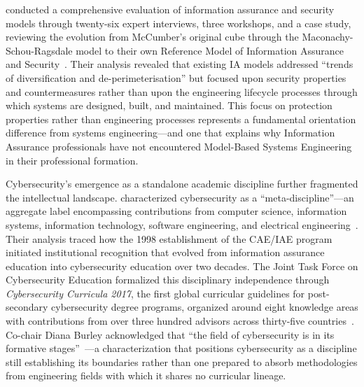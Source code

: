 \citeauthor{Cherdantseva_2016} conducted a comprehensive evaluation of information assurance and security models through twenty-six expert interviews, three workshops, and a case study, reviewing the evolution from McCumber's original cube through the Maconachy-Schou-Ragsdale model to their own Reference Model of Information Assurance and Security~\parencite{Cherdantseva_2016}. Their analysis revealed that existing IA models addressed ``trends of diversification and de-perimeterisation'' but focused upon security properties and countermeasures rather than upon the engineering lifecycle processes through which systems are designed, built, and maintained. This focus on protection properties rather than engineering processes represents a fundamental orientation difference from systems engineering---and one that explains why Information Assurance professionals have not encountered Model-Based Systems Engineering in their professional formation.

Cybersecurity's emergence as a standalone academic discipline further fragmented the intellectual landscape. \citeauthor{Parrish_2018} characterized cybersecurity as a ``meta-discipline''---an aggregate label encompassing contributions from computer science, information systems, information technology, software engineering, and electrical engineering~\parencite{Parrish_2018}. Their analysis traced how the 1998 establishment of the CAE/IAE program initiated institutional recognition that evolved from information assurance education into cybersecurity education over two decades. The Joint Task Force on Cybersecurity Education formalized this disciplinary independence through \textit{Cybersecurity Curricula 2017}, the first global curricular guidelines for post-secondary cybersecurity degree programs, organized around eight knowledge areas with contributions from over three hundred advisors across thirty-five countries~\parencite{CSEC2017}. Co-chair Diana Burley acknowledged that ``the field of cybersecurity is in its formative stages''~\parencite{CSEC2017}---a characterization that positions cybersecurity as a discipline still establishing its boundaries rather than one prepared to absorb methodologies from engineering fields with which it shares no curricular lineage.

